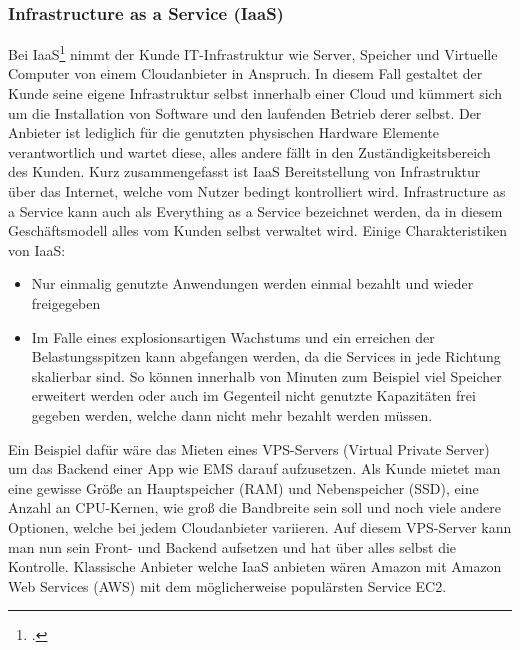 \subsubsection{Infrastructure as  a Service (IaaS)}
Bei IaaS\footcite{cloud-ms} nimmt der Kunde IT-Infrastruktur wie Server, Speicher und Virtuelle Computer von einem Cloudanbieter in Anspruch. In diesem Fall gestaltet der Kunde seine eigene Infrastruktur selbst innerhalb einer Cloud und kümmert sich um die Installation von Software und den laufenden Betrieb derer selbst. Der Anbieter ist lediglich für die genutzten physischen Hardware Elemente verantwortlich und wartet diese, alles andere fällt in den Zuständigkeitsbereich des Kunden. Kurz zusammengefasst ist IaaS Bereitstellung von Infrastruktur über das Internet, welche vom Nutzer bedingt kontrolliert wird. \newline
Infrastructure as a Service kann auch als Everything as a Service bezeichnet werden, da in diesem Geschäftsmodell alles vom Kunden selbst verwaltet wird. Einige Charakteristiken von IaaS:
\begin{itemize}
	\item Nur einmalig genutzte Anwendungen werden einmal bezahlt und wieder freigegeben
	\item Im Falle eines explosionsartigen Wachstums und ein erreichen der Belastungsspitzen kann abgefangen werden, da die Services in jede Richtung skalierbar sind. So können innerhalb von Minuten zum Beispiel viel Speicher erweitert werden oder auch im Gegenteil nicht genutzte Kapazitäten frei gegeben werden, welche dann nicht mehr bezahlt werden müssen.
\end{itemize}

Ein Beispiel dafür wäre das Mieten eines VPS-Servers (Virtual Private Server) um das Backend einer App wie EMS darauf aufzusetzen.
Als Kunde mietet man eine gewisse Größe an Hauptspeicher (RAM) und Nebenspeicher (SSD), eine Anzahl an CPU-Kernen, wie groß die 
Bandbreite sein soll und noch viele andere Optionen, welche bei jedem Cloudanbieter variieren. 
Auf diesem VPS-Server kann man nun sein Front- und Backend aufsetzen und hat über alles selbst die Kontrolle.
Klassische Anbieter welche IaaS anbieten wären Amazon mit Amazon Web Services (AWS) mit dem möglicherweise populärsten Service EC2.

